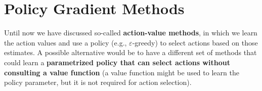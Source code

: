 \chapter{Policy Gradient Methods}
Until now we have discussed so-called \textbf{action-value methods}, in which we learn the action values and use a policy (e.g., $\varepsilon$-greedy) to select actions based on those estimates. A possible alternative would be to have a different set of methods that could learn a \textbf{parametrized policy that can select actions without consulting a value function} (a value function might be used to learn the policy parameter, but it is not required for action selection).
